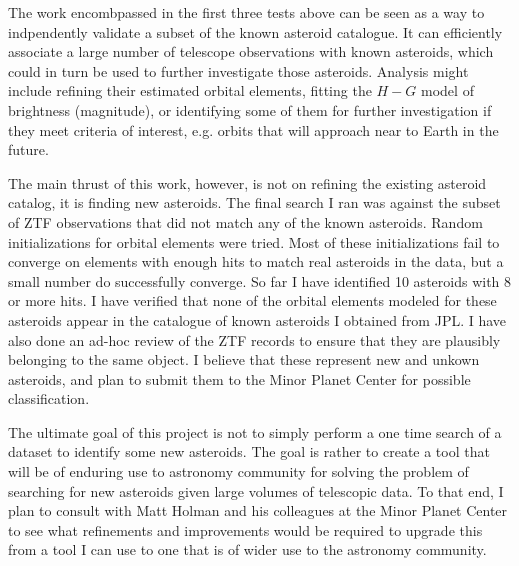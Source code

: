 The work encombpassed in the first three tests above can be seen as a way to indpendently validate a subset of the known asteroid catalogue.
It can efficiently associate a large number of telescope observations with known asteroids,
which could in turn be used to further investigate those asteroids.
Analysis might include refining their estimated orbital elements, 
fitting the $H-G$ model of brightness (magnitude), or identifying some of them for further investigation if they meet criteria of interest,
e.g. orbits that will approach near to Earth in the future.

The main thrust of this work, however, is not on refining the existing asteroid catalog, it is finding new asteroids.
The final search I ran was against the subset of ZTF observations that did not match any of the known asteroids.
Random initializations for orbital elements were tried.
Most of these initializations fail to converge on elements with enough hits to match real asteroids in the data,
but a small number do successfully converge.
So far I have identified 10 asteroids with 8 or more hits.
I have verified that none of the orbital elements modeled for these asteroids appear in the catalogue of known asteroids I obtained from JPL.
I have also done an ad-hoc review of the ZTF records to ensure that they are plausibly belonging to the same object.
I believe that these represent new and unkown asteroids, and plan to submit them to the Minor Planet Center for possible classification.

The ultimate goal of this project is not to simply perform a one time search of a dataset to identify some new asteroids.
The goal is rather to create a tool that will be of enduring use to astronomy community for solving the problem of 
searching for new asteroids given large volumes of telescopic data.
To that end, I plan to consult with Matt Holman and his colleagues at the Minor Planet Center to see what refinements and improvements
would be required to upgrade this from a tool I can use to one that is of wider use to the astronomy community.


